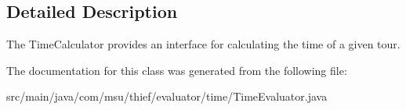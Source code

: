 \subsection{Detailed Description}
The Time\-Calculator provides an interface for calculating the time of a given tour. 

The documentation for this class was generated from the following file\-:\begin{DoxyCompactItemize}
\item 
src/main/java/com/msu/thief/evaluator/time/Time\-Evaluator.\-java\end{DoxyCompactItemize}
